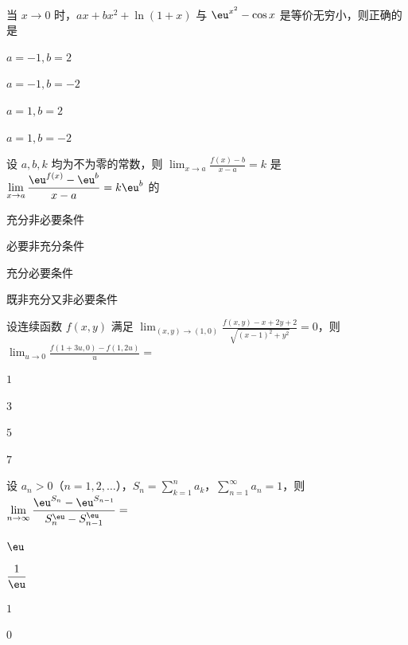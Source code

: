 
\begin{question}[index=1]
当 $x\to0$ 时，$ax+bx^2+\ln(1+x)$ 与 $\eu^{x^2}-\cos x$ 是等价无穷小，则正确的是
\begin{choices}[columns=4]
\item $a=-1,b=2$
\item $a=-1,b=-2$
\item $a=1,b=2$
\item $a=1,b=-2$
\end{choices}
\end{question}
\QuestionBreak

\begin{question}[index=2]
设 $a,b,k$ 均为不为零的常数，则 $\displaystyle\lim_{x\to a}\frac{f(x)-b}{x-a}=k$ 是 $\displaystyle\lim_{x\to a}\frac{\eu^{f(x)}-\eu^b}{x-a}=k\eu^b$ 的
\begin{choices}[columns=4]
\item 充分非必要条件
\item 必要非充分条件
\item 充分必要条件
\item 既非充分又非必要条件
\end{choices}
\end{question}
\QuestionBreak

\begin{question}[index=3]
设连续函数 $f(x,y)$ 满足 $\displaystyle\lim_{(x,y)\to(1,0)}\frac{f(x,y)-x+2y+2}{\sqrt{(x-1)^2+y^2}}=0$，则 $\displaystyle\lim_{u\to0}\frac{f(1+3u,0)-f(1,2u)}u=$
\begin{choices}[columns=4]
\item $1$
\item $3$
\item $5$
\item $7$
\end{choices}
\end{question}
\QuestionBreak

\begin{question}[index=4]
设 $a_n>0$（$n=1,2,\ldots$），$\displaystyle S_n=\sum_{k=1}^na_k$，$\displaystyle\sum_{n=1}^\infty a_n=1$，则 $\displaystyle\lim_{n\to\infty}\frac{\eu^{S_n}-\eu^{S_{n-1}}}{S_n^{\eu}-S_{n-1}^{\eu}}=$
\begin{choices}[columns=4]
\item $\eu$
\item $\dfrac1\eu$
\item $1$
\item $0$
\end{choices}
\end{question}
\QuestionBreak

